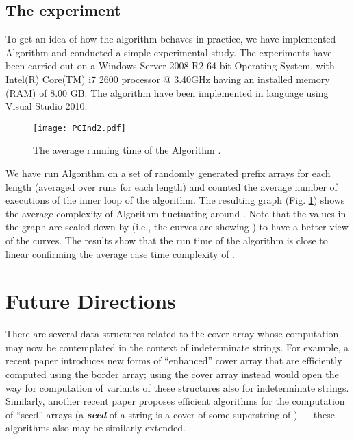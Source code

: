 \documentclass[runningheads,a4paper]{llncs}
\def\s#1{\mbox{\boldmath }}
\def\itbf#1{\textit{\textbf{#1}}}
\begin{document}
\subsection{The experiment}
To get an idea of how the algorithm behaves in practice, we have
implemented Algorithm  and conducted a simple experimental study. The
experiments have been carried out on a Windows Server
2008 R2 64-bit Operating System, with Intel(R) Core(TM) i7 2600 processor @
3.40GHz having an installed memory (RAM) of 8.00 GB. The algorithm have
been implemented in  language using Visual Studio 2010.

\begin{figure}[h!]  
  \centering
  \texttt{[image: PCInd2.pdf]}
  \caption{The average running time of the Algorithm .}
  \label{exp} 
\end{figure} 

We have run Algorithm  on a set of  randomly  generated prefix
arrays for each length  (averaged over 
runs for each length) and counted the average number of executions of the inner
loop of the algorithm. The resulting graph (Fig. \ref{exp}) shows the average
complexity of Algorithm  fluctuating around . Note that the values
 in the graph are scaled down by  (i.e., the curves are showing
) to have a better view of the curves. The results show that the
run time of the algorithm is close to linear confirming the average case time
complexity of .

\section{Future Directions}\label{sect-future}
There are several data structures related to the cover array
whose computation may now be contemplated in the context of
indeterminate strings.
For example, a recent paper \cite{FIKPPST13} introduces new forms
of ``enhanced'' cover array that are efficiently computed using the border array;
using the cover array instead would open the way for computation of variants
of these structures also for indeterminate strings.
Similarly, another recent paper \cite{CCIKPRRSW11} proposes efficient
algorithms for the computation of ``seed'' arrays
(a \itbf{seed} of a string \s{x} is a cover of some superstring of \s{x}) --- these
algorithms also may be similarly extended.
\end{document}

